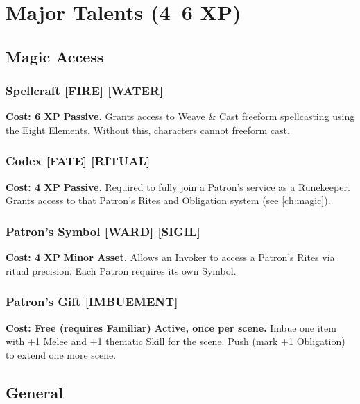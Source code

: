 \section{Major Talents (4--6 XP)}
\label{sec:major-talents}

\subsection*{Magic Access}
\label{sec:major-magic-access}

\subsubsection*{Spellcraft \textnormal{[FIRE] [WATER]}}
\label{talent:spellcraft-major}
\textbf{Cost: 6 XP} \textbf{Passive.} Grants access to Weave \& Cast freeform spellcasting using the Eight Elements. Without this, characters cannot freeform cast.

\subsubsection*{Codex \textnormal{[FATE] [RITUAL]}}
\label{talent:codex}
\textbf{Cost: 4 XP} \textbf{Passive.} Required to fully join a Patron's service as a Runekeeper. Grants access to that Patron's Rites and Obligation system (see \ref{ch:magic}).

\subsubsection*{Patron's Symbol \textnormal{[WARD] [SIGIL]}}
\label{talent:patrons-symbol}
\textbf{Cost: 4 XP} \textbf{Minor Asset.} Allows an Invoker to access a Patron's Rites via ritual precision. Each Patron requires its own Symbol.

\subsubsection*{Patron's Gift \textnormal{[IMBUEMENT]}}
\label{talent:patrons-gift}
\textbf{Cost: Free (requires Familiar)} \textbf{Active, once per scene.} Imbue one item with +1 Melee and +1 thematic Skill for the scene. Push (mark +1 Obligation) to extend one more scene.

\subsection*{General}
\label{sec:major-general}

